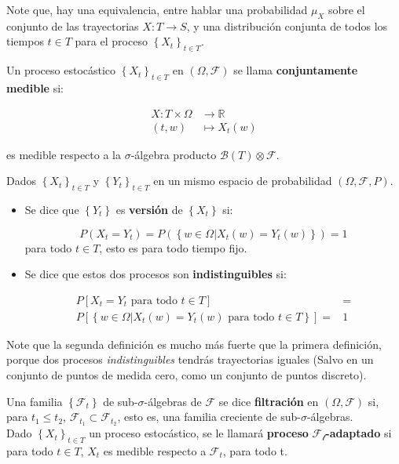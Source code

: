 Note que, hay una equivalencia, entre hablar una probabilidad $\mu_X$ sobre el conjunto de las trayectorias $X: T \rightarrow S$, y una distribución conjunta de todos los tiempos $t \in T$ para el proceso $\left\{ X_t \right\}_{t \in T}$.

\begin{boxDef}
	Un proceso estocástico $\left\{ X_t \right\}_{t \in T}$ en $(\Omega, \mathcal{F})$ se llama \textbf{conjuntamente medible} si:

	\begin{align*}
		X: T \times \Omega &\rightarrow \mathbb{R} \\
		(t, w) &\mapsto X_t (w)
	\end{align*}

	es medible respecto a la $\sigma$-álgebra producto $\mathcal{B}(T) \otimes \mathcal{F}.$

\end{boxDef}

\begin{boxDef}
	Dados $\left\{ X_t \right\}_{t \in T}$ y $\left\{ Y_t \right\}_{t \in T}$ en un mismo espacio de probabilidad $(\Omega, \mathcal{F}, P)$.

	\begin{itemize}
		\item Se dice que $\left\{ Y_t \right\}$ es \textbf{versión} de $\left\{ X_t \right\}$ si:

		\[
			P( X_t = Y_t ) = P( \left\{ w \in \Omega \vert X_t (w) = Y_t(w) \right\}) = 1
		\]
		para todo $t \in T$, esto es para todo tiempo fijo.

		\item Se dice que estos dos procesos son \textbf{indistinguibles} si:

		\begin{align*}
			P[X_t = Y_t \text{ para todo } t \in T] &= \\ 
			P[\left\{ w \in \Omega \vert X_t (w) = Y_t (w) \text{ para todo } t \in T \right\}] =& 1
		\end{align*}
	\end{itemize}


\end{boxDef}

Note que la segunda definición es mucho más fuerte que la primera definición, porque dos procesos \textit{indistinguibles} tendrás trayectorias iguales (Salvo en un conjunto de puntos de medida cero, como un conjunto de puntos discreto).

\begin{boxDef}
	Una familia $\left\{ \mathcal{F}_t \right\}$ de sub-$\sigma$-álgebras de $\mathcal{F}$ se dice \textbf{filtración} en $(\Omega, \mathcal{F})$ si, para $t_1 \leq t_2$, $\mathcal{F}_{t_1} \subset \mathcal{F}_{t_2}$, esto es, una familia creciente de sub-$\sigma$-álgebras.\\

	Dado $\left\{ X_t \right\}_{t \in T}$ un proceso estocástico, se le llamará \textbf{proceso} $\mathcal{F_t}$\textbf{-adaptado} si para todo $t \in T$, $X_t$ es medible respecto a $\mathcal{F}_t$, para todo t.
\end{boxDef}

